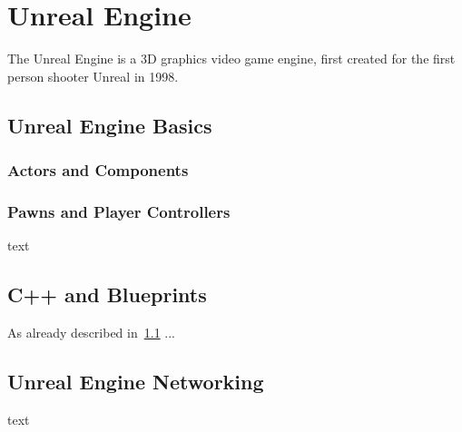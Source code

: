 \chapter{Unreal Engine}\label{chp:UnrealEngine}

The Unreal Engine is a 3D graphics video game engine, first created for the first person shooter Unreal in 1998\cite{UnrealWiki}.

\section{Unreal Engine Basics}\label{sec:Grundlage1}
\subsection{Actors and Components}
\subsection{Pawns and Player Controllers}
text
\section{C++ and Blueprints}
As already described in~\ref{sec:Grundlage1} ...
\section{Unreal Engine Networking}
text
